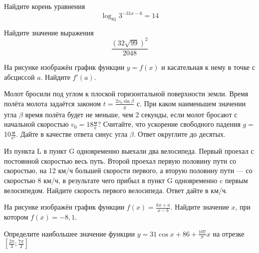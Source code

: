 \documentclass[twocolumn]{article}
\begin{document}
\begin{taskBN}{5}
Найдите корень уравнения $$\log_{81}{3^{-31x-6}}=14$$
\end{taskBN}

\begin{taskBN}{6}
Найдите значение выражения $$\frac{\left ({32\sqrt{99}}\right )^{2}}{2048}$$
\end{taskBN}

\begin{taskBN}{7}
На рисунке изображён график функции $y=f(x)$ и касательная к нему в точке с абсциссой $a$. Найдите $f'(a)$.\vspace{2.5cm}
\end{taskBN}

\begin{taskBN}{8}
Молот бросили под углом к плоской горизонтальной поверхности земли. Время полёта молота задаётся законом $t=\frac{2v_0\sin\beta}{g}$ с. При каком наименьшем значении угла $\beta$ время полёта будет не меньше, чем 2 секунды,  если молот бросают с начальной скоростью $v_0=18\frac{\mbox{м}}{\mbox{с}}$? Считайте, что ускорение свободного падения $g=$10$\frac{\mbox{м}}{\mbox{с}^2}$. Дайте в качестве ответа синус угла $\beta$. Ответ округлите до десятых.
\end{taskBN}

\begin{taskBN}{9}
Из пункта L в пункт G одновременно выехали два велосипеда. Первый проехал с постоянной скоростью весь путь. Второй проехал первую половину пути со скоростью, на 12 км/ч большей скорости первого, а вторую половину пути — со скоростью 8 км/ч, в результате чего прибыл в пункт G одновременно c первым велосипедом. Найдите скорость первого велосипеда. Ответ дайте в км/ч.
\end{taskBN}

\begin{taskBN}{10}
На рисунке изображён график функции $f(x)=\frac{kx+a}{x-b}$. Найдите значение $x$, при котором $f(x)= -8{,}1 $.\vspace{2.5cm}
\end{taskBN}

\begin{taskBN}{11}
Определите наибольшее значение функции $y = 31\cos x+86+\frac{107}{\pi}x$ на отрезке $\left[\frac{2\pi}{3};\frac{7\pi}{2} \right]$
\end{taskBN}
\end{document}
